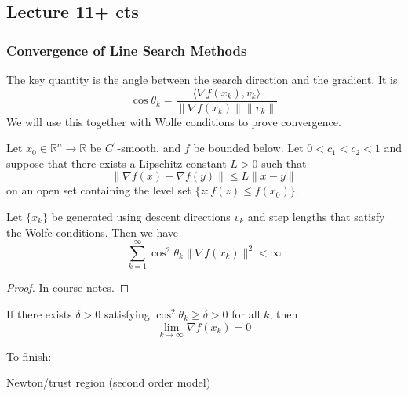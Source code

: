 \subsection{Lecture 11+ cts}
\subsubsection{Convergence of Line Search Methods}
\begin{definition}
    The key quantity is the angle between the search direction and the gradient. It is
    $$\cos \theta_k = \frac{\langle \nabla f(x_k), v_k \rangle}{\| \nabla f(x_k) \| \| v_k \|}$$
    We will use this together with Wolfe conditions to prove convergence.
\end{definition}
\begin{theorem}
    Let $x_0 \in \mathbb R^n \to \mathbb R$ be $C^1$-smooth, and $f$ be bounded below. Let $0 < c_1 < c_2 < 1$ and suppose that there exists a Lipschitz constant $L > 0$ such that $$ \| \nabla f(x) - \nabla f(y) \| \leq L \| x - y \|$$
    on an open set containing the level set $\{z: f(z) \leq f(x_0)\}$.

    Let $\{x_k\}$ be generated using descent directions $v_k$ and step lengths that satisfy the Wolfe conditions. Then we have
    $$\sum^\infty_{k=1} \cos^2 \theta_k \|\nabla f(x_k) \|^2 < \infty$$
\end{theorem}
\begin{proof}[Proof]
    In course notes.
\end{proof}
\begin{corollary}
    If there exists $\delta > 0$ satisfying $\cos^2 \theta_k \geq \delta > 0$ for all $k$, then 
    $$\lim_{k \to \infty} \nabla f(x_k) = 0$$
\end{corollary}

To finish:

Newton/trust region (second order model)

